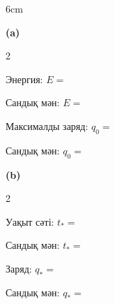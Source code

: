 
\begin{answerboxpart}{6cm}

\textbf{(a)}\vspace{\OlympAnswerGap}

\begin{multicols}{2}

Энергия: \(E=\)

\bigskip

Сандық мән: \(E=\)

\columnbreak

Максималды заряд: \(q_0=\)

\bigskip

Сандық мән: \(q_0=\)

\end{multicols}

\vspace{\OlympAnswerGap}
\textbf{(b)}
\vspace{\OlympAnswerGap}

\begin{multicols}{2}

Уақыт сәті: \(t_*=\)

\bigskip

Сандық мән: \(t_*=\)

\columnbreak

Заряд: \(q_*=\)

\bigskip

Сандық мән: \(q_*=\)

\end{multicols}

\end{answerboxpart}
